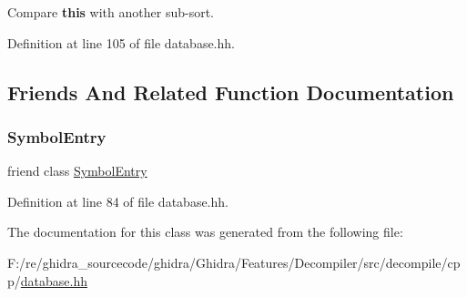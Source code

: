 Compare {\bfseries{this}} with another sub-\/sort. 



Definition at line 105 of file database.\+hh.



\subsection{Friends And Related Function Documentation}
\mbox{\label{class_symbol_entry_1_1_entry_subsort_a66ab73b76c4868b7a9981390ad794dbc}} 
\subsubsection{\texorpdfstring{SymbolEntry}{SymbolEntry}}
{\footnotesize\ttfamily friend class \mbox{\hyperlink{class_symbol_entry}{Symbol\+Entry}}\hspace{0.3cm}{\ttfamily [friend]}}



Definition at line 84 of file database.\+hh.



The documentation for this class was generated from the following file\+:\begin{DoxyCompactItemize}
\item 
F\+:/re/ghidra\+\_\+sourcecode/ghidra/\+Ghidra/\+Features/\+Decompiler/src/decompile/cpp/\mbox{\hyperlink{database_8hh}{database.\+hh}}\end{DoxyCompactItemize}
